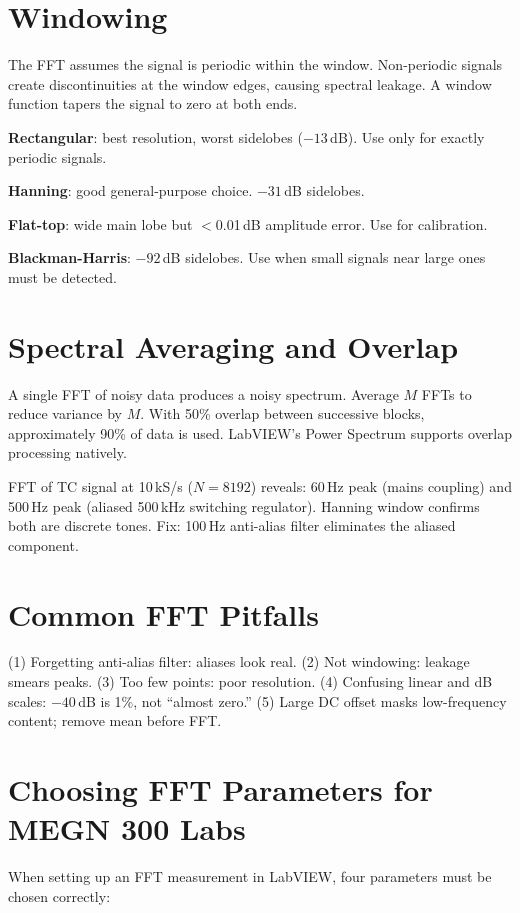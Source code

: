 \documentclass[11pt,letterpaper,twoside,openany]{book}
\begin{document}
\section{Windowing}
The FFT assumes the signal is periodic within the window. Non-periodic signals create discontinuities at the window edges, causing spectral leakage. A window function tapers the signal to zero at both ends.

\textbf{Rectangular}: best resolution, worst sidelobes ($-13$\,dB). Use only for exactly periodic signals.

\textbf{Hanning}: good general-purpose choice. $-31$\,dB sidelobes.

\textbf{Flat-top}: wide main lobe but $<$0.01\,dB amplitude error. Use for calibration.

\textbf{Blackman-Harris}: $-92$\,dB sidelobes. Use when small signals near large ones must be detected.

\section{Spectral Averaging and Overlap}
A single FFT of noisy data produces a noisy spectrum. Average $M$ FFTs to reduce variance by $M$. With 50\% overlap between successive blocks, approximately 90\% of data is used. LabVIEW's Power Spectrum supports overlap processing natively.

\begin{examplebox}
FFT of TC signal at 10\,kS/s ($N = 8192$) reveals: 60\,Hz peak (mains coupling) and 500\,Hz peak (aliased 500\,kHz switching regulator). Hanning window confirms both are discrete tones. Fix: 100\,Hz anti-alias filter eliminates the aliased component.
\end{examplebox}

\section{Common FFT Pitfalls}
(1) Forgetting anti-alias filter: aliases look real. (2) Not windowing: leakage smears peaks. (3) Too few points: poor resolution. (4) Confusing linear and dB scales: $-40$\,dB is 1\%, not ``almost zero.'' (5) Large DC offset masks low-frequency content; remove mean before FFT.


\section{Choosing FFT Parameters for MEGN 300 Labs}
When setting up an FFT measurement in LabVIEW, four parameters must be chosen correctly:
\end{document}
